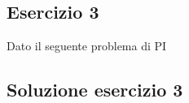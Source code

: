 \documentclass[\main/main.tex]{subfiles}
\begin{document}
\subsection{Esercizio 3}
Dato il seguente problema di PI

\subsection{Soluzione esercizio 3}
\end{document}
